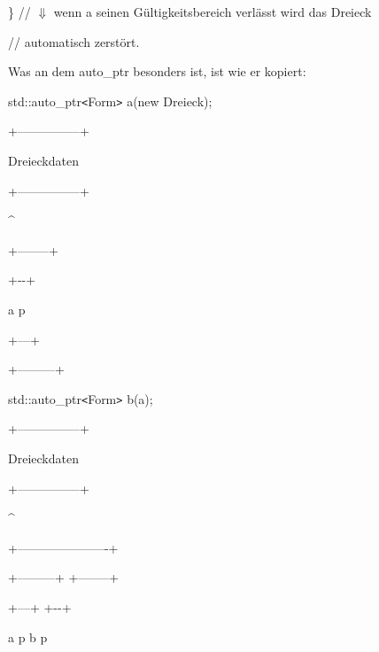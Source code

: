 \documentclass{article}
\begin{document}
\parindent=0pt
\}   // \ensuremath{\Downarrow} wenn a seinen Gültigkeitsbereich verlässt wird 
das Dreieck     

\parindent=14pt
// automatisch zerstört.

\vspace{12pt}
\parindent=0pt
Was an dem auto\_ptr besonders ist, ist wie er kopiert:

std::auto\_ptr\texttt{<}Form\texttt{>} a(new Dreieck);      

\vspace{12pt}
\parindent=21pt
+---------------+      

\textbar{}  Dreieckdaten \textbar{}      

+---------------+        

\parindent=50pt
\textasciicircum{}        

\parindent=28pt
\textbar{}        

\textbar{}        

\parindent=57pt
\textbar{}  

\parindent=7pt
+-----\textbar{}---+  

\textbar{}   +-\textbar{}-+ \textbar{}

a \textbar{} p \textbar{} \textbar{} \textbar{} \textbar{}  

\parindent=14pt
\textbar{}   +---+ \textbar{}  

\parindent=7pt
+---------+

\vspace{51pt}
\parindent=0pt
std::auto\_ptr\texttt{<}Form\texttt{>} b(a);      

\vspace{12pt}
\parindent=21pt
+---------------+      

\textbar{}  Dreieckdaten \textbar{}      

+---------------+        

\parindent=50pt
\textasciicircum{}        

\parindent=28pt
\textbar{}        

+----------------------+                               

\parindent=140pt
\textbar{}  

\parindent=7pt
+---------+            +-----\textbar{}---+  

\textbar{}   +---+ \textbar{}            \textbar{}   +-\textbar{}-+ \textbar{}

a \textbar{} p \textbar{}   \textbar{} \textbar{}          b \textbar{} p \textbar{} 
\textbar{} \textbar{} \textbar{}  
\end{document}
